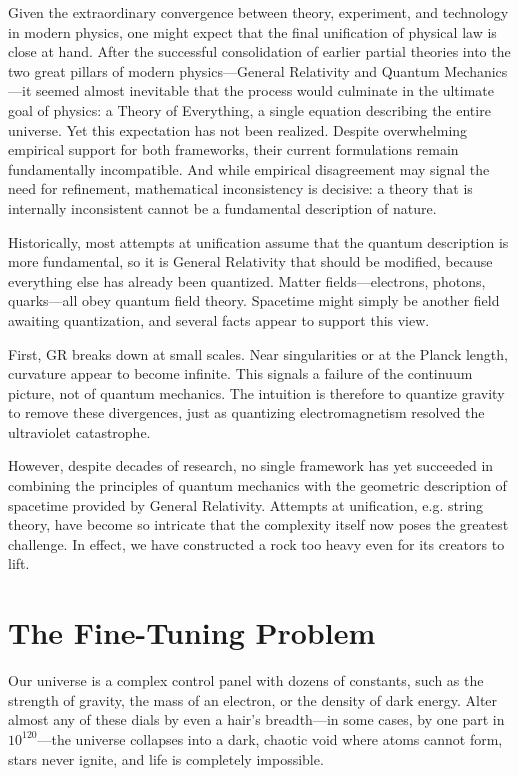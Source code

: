 Given the extraordinary convergence between theory, experiment, and technology in modern physics, one might expect that the final unification of physical law is close at hand. After the successful consolidation of earlier partial theories into the two great pillars of modern physics—General Relativity and Quantum Mechanics—it seemed almost inevitable that the process would culminate in the ultimate goal of physics: a Theory of Everything, a single equation describing the entire universe. Yet this expectation has not been realized. Despite overwhelming empirical support for both frameworks, their current formulations remain fundamentally incompatible. And while empirical disagreement may signal the need for refinement, mathematical inconsistency is decisive: a theory that is internally inconsistent cannot be a fundamental description of nature.

Historically, most attempts at unification assume that the quantum description is more fundamental, so it is General Relativity that should be modified, because everything else has already been quantized. Matter fields—electrons, photons, quarks—all obey quantum field theory. Spacetime might simply be another field awaiting quantization, and several facts appear to support this view.

First, GR breaks down at small scales. Near singularities or at the Planck length, curvature appear to become infinite. This signals a failure of the continuum picture, not of quantum mechanics. The intuition is therefore to quantize gravity to remove these divergences, just as quantizing electromagnetism resolved the ultraviolet catastrophe.

However, despite decades of research, no single framework has yet succeeded in combining the principles of quantum mechanics with the geometric description of spacetime provided by General Relativity. Attempts at unification, e.g. string theory, have become so intricate that the complexity itself now poses the greatest challenge. In effect, we have constructed a rock too heavy even for its creators to lift.


\section{The Fine-Tuning Problem}

Our universe is a complex control panel with dozens of constants, such as the strength of gravity, the mass of an electron, or the density of dark energy.
Alter almost any of these dials by even a hair’s breadth—in some cases, by one part in $10^{120}$—the universe collapses into a dark,
chaotic void where atoms cannot form, stars never ignite, and life is completely impossible.

